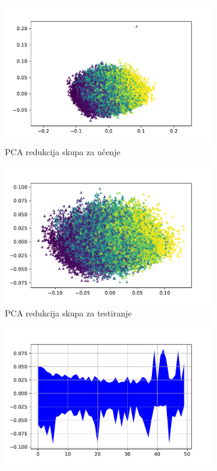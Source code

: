 \documentclass[times, utf8, numeric, diplomski]{fer}
\begin{document}
\begin{figure}[H]
\begin{subfigure}{.5\textwidth}
\includegraphics[width=\textwidth]{nl256_tr_instances.pdf}
\centering
\caption{PCA redukcija skupa za učenje}
\label{fig:dpa2_train_pca}
\end{subfigure}
\begin{subfigure}{.5\textwidth}
\includegraphics[width=\textwidth]{nl256_ts_instances.pdf}
\centering
\caption{PCA redukcija skupa za testiranje}
\label{fig:dpa2_test_pca}
\end{subfigure}
\begin{subfigure}{.5\textwidth}
\includegraphics[width=\textwidth]{nl256_tr_inputs.pdf}

\end{subfigure}
\end{figure}
\end{document}
